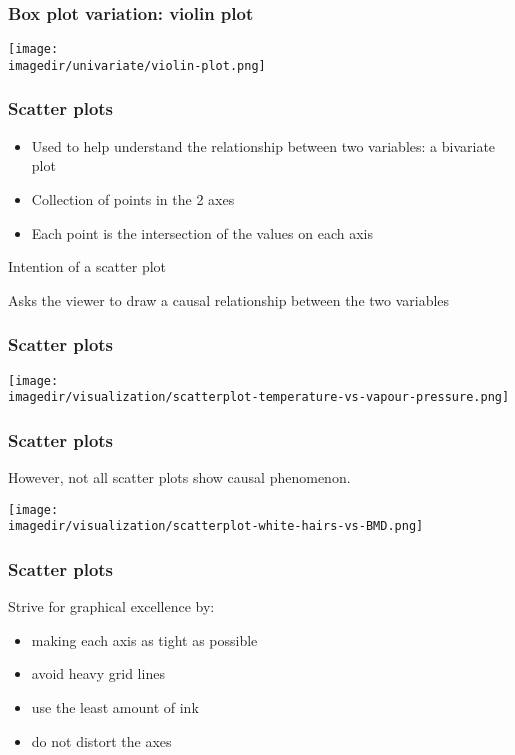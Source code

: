 \begin{frame}\frametitle{Box plot variation: violin plot}
	\begin{center}
		\texttt{[image: \\imagedir/univariate/violin-plot.png]}
	\end{center}
\end{frame}

\begin{frame}\frametitle{Scatter plots}
	\begin{itemize}
		\item	Used to help understand the relationship between two variables: a bivariate plot 
		\item	Collection of points in the 2 axes 
		\item	Each point is the intersection of the values on each axis 
	\end{itemize}
	\begin{block}
		{Intention of a scatter plot} 
		\begin{center}
			Asks the viewer to draw a causal relationship between the two variables 
		\end{center}
	\end{block}
\end{frame}

\begin{frame}\frametitle{Scatter plots}
	\begin{center}
		\texttt{[image: \\imagedir/visualization/scatterplot-temperature-vs-vapour-pressure.png]}
	\end{center}
\end{frame}

\begin{frame}\frametitle{Scatter plots}
	However, not all scatter plots show causal phenomenon. 
	\begin{center}
		\texttt{[image: \\imagedir/visualization/scatterplot-white-hairs-vs-BMD.png]}
	\end{center}
\end{frame}


\begin{frame}\frametitle{Scatter plots}
	Strive for graphical excellence by:
	\begin{itemize}
		\item	making each axis as tight as possible 
		\item	avoid heavy grid lines 
		\item	use the least amount of ink 
		\item	do not distort the axes 
	\end{itemize}
\end{frame}


